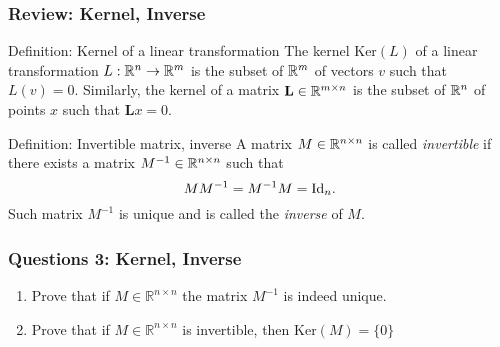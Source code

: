 \documentclass{beamer}
\begin{document}
\begin{frame}[t]
	\frametitle{Review: Kernel, Inverse} 
	\begin{block}{Definition: Kernel of a linear transformation}
	The kernel $\text{Ker}(L)$ of a linear transformation $L: \mathbb{R}^n \to \mathbb{R}^m$ is the subset of $\mathbb{R}^m$ of vectors $v$ such that $ L(v) = 0$. Similarly, the kernel of a matrix $\mathbf{L} \in \mathbb{R}^{m \times n}$ is the subset of $\mathbb{R}^n$ of points $x$ such that $\mathbf{L} x = 0$.
	\end{block}
	
	\begin{block}{Definition: Invertible matrix, inverse}
	A matrix $M \in \mathbb{R}^{n \times n}$ is called \emph{invertible} if there exists a matrix $M^{-1} \in \mathbb{R}^{n \times n}$ such that 
	$$
	M M^{-1} = M^{-1} M = {{\rm Id}}_n.
	$$
	Such matrix $M^{-1}$ is unique and is called the \emph{inverse} of $M$.
	\end{block}
\end{frame}

\begin{frame}[t]
	\frametitle{Questions 3: Kernel, Inverse} 
	\grid
	\begin{enumerate}
	\item Prove that if $M \in \mathbb{R}^{n \times n}$ the matrix $M^{-1}$ is indeed unique. 
	\item Prove that if $M \in \mathbb{R}^{n \times n}$ is invertible, then $\text{Ker}(M) = \{0\}$
	\end{enumerate}
	\pause
	\pause
\end{frame}
\end{document}
